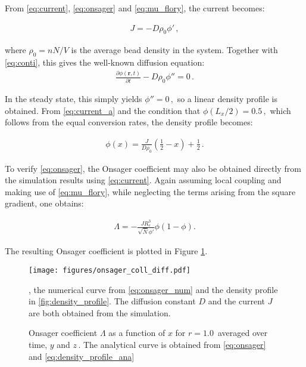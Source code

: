 \documentclass[bachelor,       %
               twoside,        %
               BCOR10mm,       %
                ngerman,english  %
               ]{GAUBM}
\begin{document}
From \eqref{eq:current}, \eqref{eq:onsager} and \eqref{eq:mu_flory}, the current becomes:


\begin{align}
  J=-D\rho_0\phi'\,,
  \label{eq:current_a}
\end{align}



where $\rho_0=nN/V$ is the average bead density in the system. Together with \eqref{eq:conti}, this gives the well-known diffusion equation:
\begin{align}
  \frac{\partial\phi(\mathbf r, t)}{\partial t}-D\rho_0  \phi''=0\,.
  \label{eq:diffusion}
\end{align}

In the steady state, this simply yields $\phi''=0\,,$ so a linear density profile is obtained. From \eqref{eq:current_a} and the condition that $\phi(L_x/2)=0.5\,,$ which follows from the equal conversion rates, the density profile becomes:

\begin{align}
  \phi(x)=\frac{J}{D\rho_0}\left(\frac{1}{2}-x\right) + \frac{1}{2}\,.
  \label{eq:density_profile_ana}
\end{align}

To verify \eqref{eq:onsager}, the Onsager coefficient may also be obtained directly from the simulation results using \eqref{eq:current}. Again assuming local coupling and making use of \eqref{eq:mu_flory}, while neglecting the terms arising from the square gradient, one obtains:

\begin{align}
  \Lambda=-\frac{JR_e^3}{\sqrt{\bar N}\phi'}\phi(1-\phi).
  \label{eq:onsager_num}
\end{align}

The resulting Onsager coefficient is plotted in Figure \ref{fig:onsager_coeff}.

\begin{figure}[h]
  \centering
  \texttt{[image: figures/onsager\_coll\_diff.pdf]}
  \caption{Onsager coefficient $\Lambda$ as a function of $x$ for $r=1.0\,$ averaged over time, $y$ and $z\,$. The analytical curve is obtained from \eqref{eq:onsager} and \eqref{eq:density_profile_ana}}, the numerical curve from \eqref{eq:onsager_num} and the density profile in \ref{fig:density_profile}. The diffusion constant $D$ and the current $J$ are both obtained from the simulation.
  \label{fig:onsager_coeff}
\end{figure}
\end{document}
